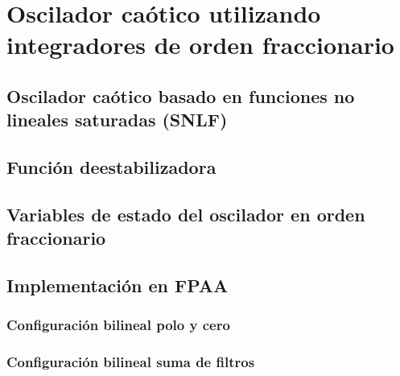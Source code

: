 \chapter{Oscilador caótico utilizando integradores de orden fraccionario}

	\section{Oscilador caótico basado en funciones no lineales saturadas (SNLF)}
	
	\section{Función deestabilizadora}
	
	\section{Variables de estado del oscilador en orden fraccionario}
	
	\section{Implementación en FPAA}
	
		\subsection{Configuración bilineal polo y cero}
	
		\subsection{Configuración bilineal suma de filtros}